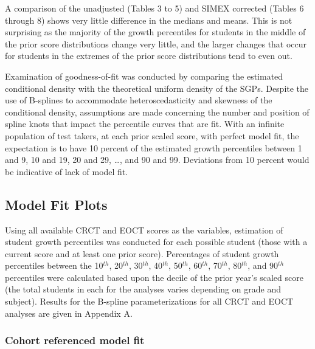 \documentclass[12pt]{article}
\begin{document}
A comparison of the unadjusted (Tables 3 to 5) and SIMEX corrected
(Tables 6 through 8) shows very little difference in the medians and
means. This is not surprising as the majority of the growth percentiles
for students in the middle of the prior score distributions change very
little, and the larger changes that occur for students in the extremes
of the prior score distributions tend to even out.


Examination of goodness-of-fit was conducted by comparing the estimated
conditional density with the theoretical uniform density of the SGPs.
Despite the use of B-splines to accommodate heteroscedasticity and
skewness of the conditional density, assumptions are made concerning the
number and position of spline knots that impact the percentile curves
that are fit. With an infinite population of test takers, at each prior
scaled score, with perfect model fit, the expectation is to have 10
percent of the estimated growth percentiles between 1 and 9, 10 and 19,
20 and 29, \ldots{}, and 90 and 99. Deviations from 10 percent would be
indicative of lack of model fit.

\subsection{Model Fit Plots}\label{model-fit-plots}

Using all available CRCT and EOCT scores as the variables, estimation of
student growth percentiles was conducted for each possible student
(those with a current score and at least one prior score). Percentages
of student growth percentiles between the 10\(^{th}\), 20\(^{th}\),
30\(^{th}\), 40\(^{th}\), 50\(^{th}\), 60\(^{th}\), 70\(^{th}\),
80\(^{th}\), and 90\(^{th}\) percentiles were calculated based upon the
decile of the prior year's scaled score (the total students in each for
the analyses varies depending on grade and subject). Results for the
B-spline parameterizations for all CRCT and EOCT analyses are given in
Appendix A.

\subsubsection{Cohort referenced model
fit}\label{cohort-referenced-model-fit}
\end{document}
